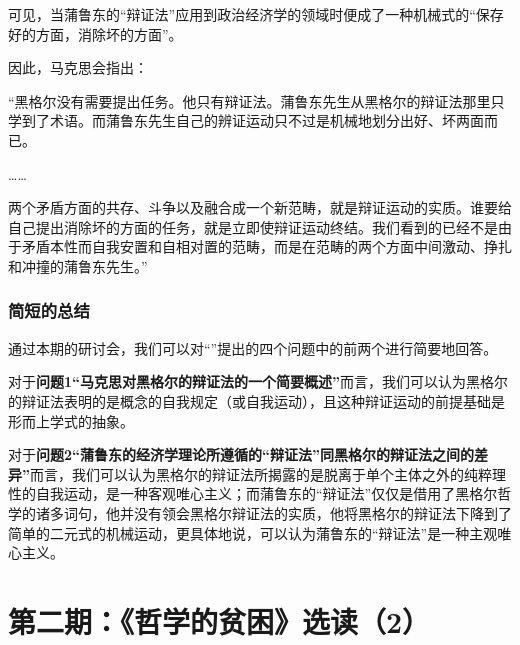 \documentclass[a4paper,twoside,12pt,AutoFakeBold]{ctexart}
\begin{document}
可见，当蒲鲁东的“辩证法”应用到政治经济学的领域时便成了一种机械式的“保存好的方面，消除坏的方面”。

因此，马克思会指出：

\begin{adjustwidth}{2em}{2em}
\qquad\fangsong
    “黑格尔没有需要提出任务。他只有辩证法。蒲鲁东先生从黑格尔的辩证法那里只学到了术语。而蒲鲁东先生自己的辨证运动只不过是机械地划分出好、坏两面而已。
    
    ……
    
    两个矛盾方面的共存、斗争以及融合成一个新范畴，就是辩证运动的实质。谁要给自己提出消除坏的方面的任务，就是立即使辩证运动终结。我们看到的已经不是由于矛盾本性而自我安置和自相对置的范畴，而是在范畴的两个方面中间激动、挣扎和冲撞的蒲鲁东先生。”

\end{adjustwidth}
    
\subsubsection{简短的总结}

通过本期的研讨会，我们可以对“\textbf{}”提出的四个问题中的前两个进行简要地回答。

对于\textbf{问题1“马克思对黑格尔的辩证法的一个简要概述”}而言，我们可以认为黑格尔的辩证法表明的是概念的自我规定（或自我运动），且这种辩证运动的前提基础是形而上学式的抽象。

对于\textbf{问题2“蒲鲁东的经济学理论所遵循的“辩证法”同黑格尔的辩证法之间的差异”}而言，我们可以认为黑格尔的辩证法所揭露的是脱离于单个主体之外的纯粹理性的自我运动，是一种客观唯心主义；而蒲鲁东的“辩证法”仅仅是借用了黑格尔哲学的诸多词句，他并没有领会黑格尔辩证法的实质，他将黑格尔的辩证法下降到了简单的二元式的机械运动，更具体地说，可以认为蒲鲁东的“辩证法”是一种主观唯心主义。
\newpage

\section{第二期：《哲学的贫困》选读（2）}
\end{document}
